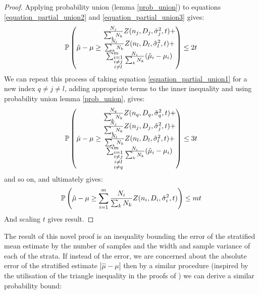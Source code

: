 \begin{proof}
Applying probability union (lemma \ref{prob_union}) to equations \ref{equation_partial_union2} and \ref{equation_partial_union3} gives:
$$ \p\left(\hat{\mu}-\mu \ge \begin{matrix*} \frac{N_j}{\sum_kN_k}Z(n_j,D_j,\hat{\sigma}^2_j,t) +\\ \frac{N_l}{\sum_kN_k}Z(n_l,D_l,\hat{\sigma}^2_l,t) +\\ \sum_{\substack{i=1 \\ i\ne j\\i\ne l}}^m\frac{N_i}{\sum_kN_k}(\hat{\mu}_i-\mu_i)\end{matrix*}\right) \le 2t $$
We can repeat this process of taking equation \ref{equation_partial_union1} for a new index $q\ne j\ne l$, adding appropriate terms to the inner inequality and using probability union lemma \ref{prob_union}, gives:
$$ \p\left(\hat{\mu}-\mu \ge \begin{matrix*} \frac{N_q}{\sum_kN_k}Z(n_q,D_q,\hat{\sigma}^2_q,t) +\\\frac{N_j}{\sum_kN_k}Z(n_j,D_j,\hat{\sigma}^2_j,t) +\\ \frac{N_l}{\sum_kN_k}Z(n_l,D_l,\hat{\sigma}^2_l,t) +\\ \sum_{\substack{i=1 \\ i\ne j\\i\ne l\\i\ne q}}^m\frac{N_i}{\sum_kN_k}(\hat{\mu}_i-\mu_i)\end{matrix*}\right) \le 3t $$
and so on, and ultimately gives:
$$ \operatorname{\mathbb{P}}\left(\hat{\mu}-\mu \ge \sum_{i=1}^m\frac{N_i}{\sum_kN_k} Z(n_i,D_i,\hat{\sigma}^2_i,t)\right)\le mt $$
And scaling $t$ gives result.
\end{proof}

The result of this novel proof is an inequality bounding the error of the stratified mean estimate by the number of samples and the width and sample variance of each of the strata.
If instead of the error, we are concerned about the absolute error of the stratified estimate $|\hat{\mu}-\mu|$ then by a similar procedure (inspired by the utilisation of the triangle inequality in the proofs of \cite{2013arXiv1306.4265M}) we can derive a similar probability bound:

